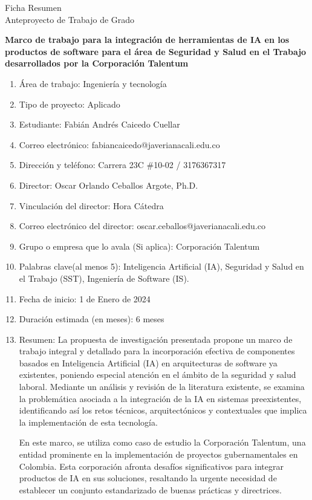 \thispagestyle{empty}
\begin{center}
    \Large{Ficha Resumen \\ Anteproyecto de Trabajo de Grado}
\end{center}

\textbf{Marco de trabajo para la integración de herramientas de IA en los productos de software para el área de Seguridad y Salud en el Trabajo desarrollados por la Corporación Talentum}
\begin{enumerate}
    \item Área de trabajo: Ingeniería y tecnología
    \item Tipo de proyecto: Aplicado
    \item Estudiante: Fabián Andrés Caicedo Cuellar
    \item Correo electrónico: fabiancaicedo@javerianacali.edu.co
    \item Dirección y teléfono: Carrera 23C \#10-02 / 3176367317
    \item Director: Oscar Orlando Ceballos Argote, Ph.D.
    \item Vinculación del director: Hora C\'atedra
    \item Correo electrónico del director: oscar.ceballos@javerianacali.edu.co
    \item Grupo o empresa que lo avala (Si aplica): Corporación Talentum
    \item Palabras clave(al menos 5): Inteligencia Artificial (IA), Seguridad y Salud en el Trabajo
(SST), Ingeniería de Software (IS).
    \item Fecha de inicio: 1 de Enero de 2024
    \item Duración estimada (en meses): 6 meses
    \item Resumen:  La propuesta de investigación presentada propone un marco de trabajo integral y detallado para la incorporación efectiva de componentes basados en Inteligencia Artificial (IA) en arquitecturas de software ya existentes, poniendo especial atención en el ámbito de la seguridad y salud laboral. Mediante un análisis y revisión de la literatura existente, se examina la problemática asociada a la integración de la IA en sistemas preexistentes, identificando así los retos técnicos, arquitectónicos y contextuales que implica la implementación de esta tecnología.

En este marco, se utiliza como caso de estudio la Corporación Talentum, una entidad prominente en la implementación de proyectos gubernamentales en Colombia. Esta corporación afronta desafíos significativos para integrar productos de IA en sus soluciones, resaltando la urgente necesidad de establecer un conjunto estandarizado de buenas prácticas y directrices.


\end{enumerate}

